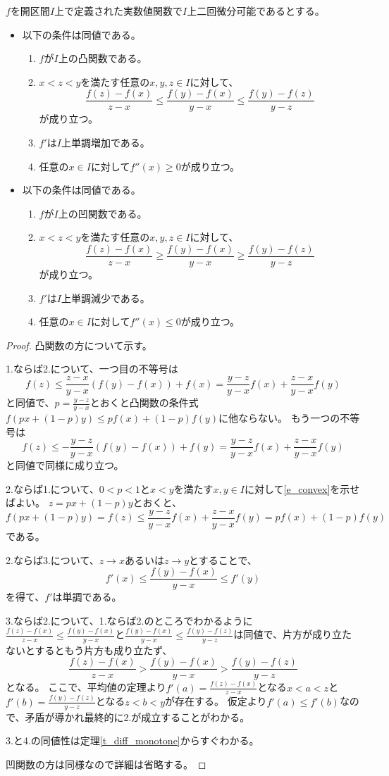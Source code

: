 \begin{proposition}[凸関数の特徴づけ]
\label{t_convex}
$f$を開区間$I$上で定義された実数値関数で$I$上二回微分可能であるとする。
\begin{itemize}
\item
以下の条件は同値である。
\begin{enumerate}
\item
$f$が$I$上の凸関数である。
\item
$x < z < y$を満たす任意の$x, y, z \in I$に対して、
$$
\frac{f(z)-f(x)}{z-x} \le \frac{f(y)-f(x)}{y-x} \le \frac{f(y)-f(z)}{y-z}
$$
が成り立つ。
\item
$f'$は$I$上単調増加である。
\item
任意の$x \in I$に対して$f''(x) \ge 0$が成り立つ。
\end{enumerate}
\item
以下の条件は同値である。
\begin{enumerate}
\item
$f$が$I$上の凹関数である。
\item
$x < z < y$を満たす任意の$x, y, z \in I$に対して、
$$
\frac{f(z)-f(x)}{z-x} \ge \frac{f(y)-f(x)}{y-x} \ge \frac{f(y)-f(z)}{y-z}
$$
が成り立つ。
\item
$f'$は$I$上単調減少である。
\item
任意の$x \in I$に対して$f''(x) \le 0$が成り立つ。
\end{enumerate}
\end{itemize}
\end{proposition}

\begin{proof}
凸関数の方について示す。

1.ならば2.について、一つ目の不等号は
$$
f(z) \le \frac{z-x}{y-x}(f(y)-f(x))+f(x) = \frac{y-z}{y-x}f(x)+\frac{z-x}{y-x}f(y)
$$
と同値で、$p = \frac{y-z}{y-x}$とおくと凸関数の条件式$f(p x+(1-p)y) \le p f(x)+(1-p)f(y)$に他ならない。
もう一つの不等号は
$$
f(z) \le -\frac{y-z}{y-x}(f(y)-f(x))+f(y) = \frac{y-z}{y-x}f(x)+\frac{z-x}{y-x}f(y)
$$
と同値で同様に成り立つ。

2.ならば1.について、$0 < p < 1$と$x < y$を満たす$x, y \in I$に対して\eqref{e_convex}を示せばよい。
$z = p x+(1-p)y$とおくと、
$$
f(p x+(1-p)y) = f(z) \le \frac{y-z}{y-x}f(x)+\frac{z-x}{y-x}f(y) = p f(x)+(1-p)f(y)
$$
である。

2.ならば3.について、$z \to x$あるいは$z \to y$とすることで、
$$
f'(x) \le \frac{f(y)-f(x)}{y-x} \le f'(y)
$$
を得て、$f'$は単調である。

3.ならば2.について、1.ならば2.のところでわかるように$\frac{f(z)-f(x)}{z-x} \le \frac{f(y)-f(x)}{y-x}$と$\frac{f(y)-f(x)}{y-x} \le \frac{f(y)-f(z)}{y-z}$は同値で、片方が成り立たないとするともう片方も成り立たず、
$$
\frac{f(z)-f(x)}{z-x} > \frac{f(y)-f(x)}{y-x} > \frac{f(y)-f(z)}{y-z}
$$
となる。
ここで、平均値の定理より$f'(a) = \frac{f(z)-f(x)}{z-x}$となる$x < a < z$と$f'(b) = \frac{f(y)-f(z)}{y-z}$となる$z < b < y$が存在する。
仮定より$f'(a) \le f'(b)$なので、矛盾が導かれ最終的に2.が成立することがわかる。

3.と4.の同値性は定理\ref{t_diff_monotone}からすぐわかる。

凹関数の方は同様なので詳細は省略する。
\end{proof}

